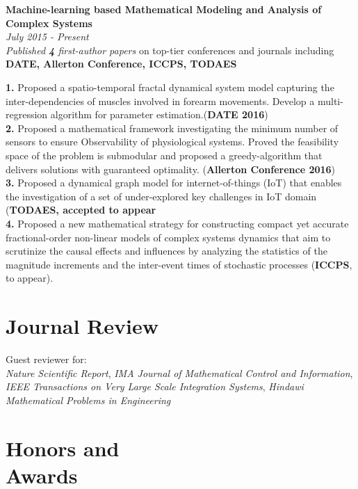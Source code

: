 \documentclass[margin,line]{cv}
\begin{document}
\begin{resume}
\textbf{Machine-learning based Mathematical Modeling and Analysis of Complex Systems}  \\ \textit{July 2015 - Present}\\
\textit{Published \textbf{4} first-author papers} on top-tier conferences and journals including \textbf{DATE, Allerton Conference, ICCPS, TODAES}

\textbf{1.}  Proposed a spatio-temporal fractal dynamical system model capturing the inter-dependencies of muscles involved in forearm movements. Develop a multi-regression algorithm for parameter estimation.(\textbf{DATE 2016})\\
\textbf{2.}  Proposed a mathematical framework investigating the minimum number of sensors to ensure Observability of physiological systems. Proved the feasibility space of the problem is submodular and proposed a greedy-algorithm that delivers solutions with guaranteed optimality. (\textbf{Allerton Conference 2016})\\
\textbf{3.}  Proposed a dynamical graph model for internet-of-things (IoT) that enables the investigation of a set of under-explored key challenges in IoT domain (\textbf{TODAES, accepted to appear}\\
\textbf{4.} Proposed a new mathematical strategy for constructing compact yet accurate fractional-order non-linear models of complex systems dynamics that aim to scrutinize the causal effects and influences by analyzing the statistics of the magnitude increments and the inter-event times of stochastic processes (\textbf{ICCPS}, to appear). 

    \section{\mysidestyle Journal Review}
    Guest reviewer for:\\
        \textit{Nature Scientific Report}, \textit{IMA Journal of Mathematical Control and Information}, \textit{IEEE Transactions on Very Large Scale Integration Systems}, \textit{Hindawi Mathematical Problems in Engineering}
    \section{\mysidestyle Honors and\\Awards}


\end{resume}
\end{document}
